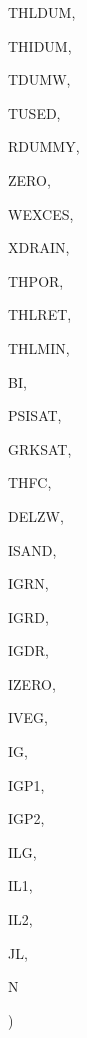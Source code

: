 {\begin{DoxyParamCaption}
\item[{real, dimension(ilg,ig)}]{T\+H\+L\+D\+U\+M, }
\item[{real, dimension(ilg,ig)}]{T\+H\+I\+D\+U\+M, }
\item[{real, dimension (ilg,ig)}]{T\+D\+U\+M\+W, }
\item[{real, dimension (ilg)}]{T\+U\+S\+E\+D, }
\item[{real, dimension(ilg)}]{R\+D\+U\+M\+M\+Y, }
\item[{real, dimension  (ilg)}]{Z\+E\+R\+O, }
\item[{real, dimension(ilg)}]{W\+E\+X\+C\+E\+S, }
\item[{real, dimension(ilg)}]{X\+D\+R\+A\+I\+N, }
\item[{real, dimension (ilg,ig)}]{T\+H\+P\+O\+R, }
\item[{real, dimension(ilg,ig)}]{T\+H\+L\+R\+E\+T, }
\item[{real, dimension(ilg,ig)}]{T\+H\+L\+M\+I\+N, }
\item[{real, dimension    (ilg,ig)}]{B\+I, }
\item[{real, dimension(ilg,ig)}]{P\+S\+I\+S\+A\+T, }
\item[{real, dimension(ilg,ig)}]{G\+R\+K\+S\+A\+T, }
\item[{real, dimension  (ilg,ig)}]{T\+H\+F\+C, }
\item[{real, dimension (ilg,ig)}]{D\+E\+L\+Z\+W, }
\item[{integer, dimension (ilg,ig)}]{I\+S\+A\+N\+D, }
\item[{integer, dimension  (ilg)}]{I\+G\+R\+N, }
\item[{integer, dimension  (ilg)}]{I\+G\+R\+D, }
\item[{integer, dimension  (ilg)}]{I\+G\+D\+R, }
\item[{integer, dimension (ilg)}]{I\+Z\+E\+R\+O, }
\item[{integer}]{I\+V\+E\+G, }
\item[{integer}]{I\+G, }
\item[{integer}]{I\+G\+P1, }
\item[{integer}]{I\+G\+P2, }
\item[{integer}]{I\+L\+G, }
\item[{integer}]{I\+L1, }
\item[{integer}]{I\+L2, }
\item[{integer}]{J\+L, }
\item[{integer}]{N}
\end{DoxyParamCaption}
)}\label{WEND_8f_aef71fcd76a2c9c23bd3d07a80231ca8b}

